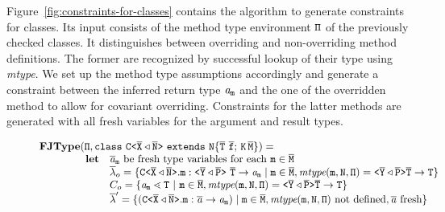 \documentclass[a4paper,USenglish,cleveref, autoref, thm-restate, anonymous]{lipics-v2021}
\begin{document}
Figure~\ref{fig:constraints-for-classes} contains the algorithm
{\fjtype} to generate constraints for classes. Its input
consists of the method type environment ${\tt \Pi}$ of the previously
checked classes. It distinguishes between overriding and
non-overriding method definitions. The former are recognized by
successful lookup of their type using \textit{mtype}. We set up the
method type assumptions accordingly and generate a constraint between
the inferred return type $\mathit{ a }_{{\tt m}}$ and the one of the
overridden method to allow for covariant overriding.
Constraints for the latter methods are generated with all fresh
variables for the argument and result types.

\begin{figure}[tp]
  \begin{gather*}
    \begin{array}{@{}l@{}l}
      \fjtype & ({\mv{\Pi}}, \mathtt{class } \ \exptype{C}{\ol{X} \triangleleft \ol{N}} \ \mathtt{ extends } \ \mathtt{N \{ \overline{T} \ \overline{f}; \, K \, \overline{M} \}}) =\\
              & \begin{array}{ll@{}l}
                  \textbf{let} & \overline{\tv{a}}_{\mv m} \text{ be fresh type variables
                                 for each }\mv{m}\in\ol{M} \\
                               & \ol{\methodAssumption}_o = \set{\exptype{C}{\ol{X} \triangleleft \ol{N}}.\mv{m} :
                                 \exptype{}{\ol{Y} \triangleleft \ol{P}}\ \ol{T} \to \tv{a}_{\mv m} \mid \mv{m} \in \ol{M},
                                 \textit{mtype}(\mv{m}, \type{N}, \mv\Pi) = \exptype{}{\ol{Y} \triangleleft \ol{P}} \ol{\type{T}} \to \type{T}}\\
                               & \consSet_o = \set{\tv{a}_{\mv m} \lessdot \type{T} \ |\ \texttt{m} \in \ol{M}, 
                                 \textit{mtype}(\mv{m}, \mv{N}, \mv\Pi) = \exptype{}{\ol{Y} \triangleleft \ol{P}} \ol{\type{T}} \to \type{T}}\\
                               & \ol{\methodAssumption}' = 
                                 \set{ (\exptype{C}{\ol{X} \triangleleft \ol{N}}.\mv{m} : \ol{\tv{a}} \to \tv{a}_{\mv
                                 m}) \mid \mv{m} \in \ol{M},
                                 \textit{mtype} (\mv m, \mv N,
                                 \mv\Pi) \text{ not defined}, \ol{\tv{a}}\ \text{fresh} } \\

\end{array}
\end{array}
\end{gather*}
\end{figure}
\end{document}
